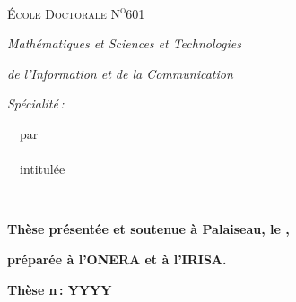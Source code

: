 {\begin{titlepage}
{  {\large \scshape{École Doctorale N\textsuperscript{o}601}}

  \emph{Mathématiques et Sciences et Technologies}

  \emph{de l'Information et de la Communication}

  \emph{Spécialité\,: \@specialite}

        \medskip
        ~~par\\
        \medskip
        {\Huge\hspace{2cm} \textbf{~~~\@author}}\\

        \medskip
        ~~intitulée\\
        \medskip

        {\LARGE~~~\@title}

        \medskip
        \textbf{Thèse présentée et soutenue à Palaiseau, le \@date,}

        \textbf{préparée à l'ONERA et à l'IRISA.}

        \textbf{Thèse n\,: YYYY}

}
\end{titlepage}}

